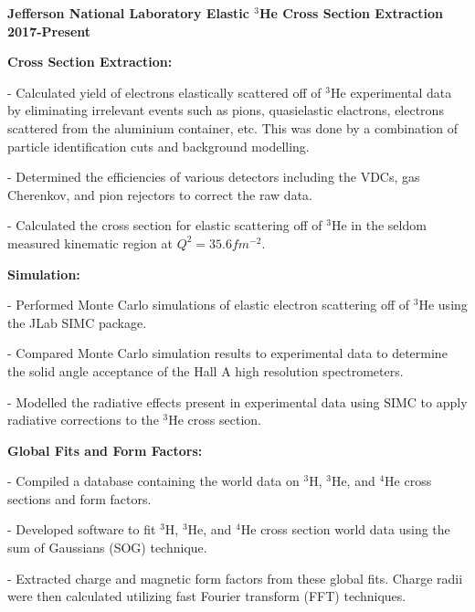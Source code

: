 \documentclass[letterpaper,10pt]{article}
\renewenvironment{itemize}{
  \begin{list}{}{
    \setlength{\leftmargin}{1.5em}
  }
}{
  \end{list}
}
\begin{document}
{\begin{itemize}
\item {\large {\bf Jefferson National Laboratory Elastic $^{3}$He Cross Section Extraction 2017-Present} }
	\begin{itemize}\itemsep1pt \parskip0pt 
		\item \textbf{Cross Section Extraction:}
			\begin{itemize}
				\item - Calculated yield of electrons elastically scattered off of $^{3}$He experimental data by eliminating irrelevant events such as pions, quasielastic elactrons, electrons scattered from the aluminium container, etc. This was done by a combination of particle identification cuts and background modelling. 
				\item - Determined the efficiencies of various detectors including the VDCs, gas Cherenkov, and pion rejectors to correct the raw data.
				\item - Calculated the cross section for elastic scattering off of $^{3}$He in the seldom measured kinematic region at $Q^2 = 35.6 fm^{-2}$.
			\end{itemize}
		\item \textbf{Simulation:}
			\begin{itemize}
				\item - Performed Monte Carlo simulations of elastic electron scattering off of $^{3}$He using the JLab SIMC package. 
				\item - Compared Monte Carlo simulation results to experimental data to determine the solid angle acceptance of the Hall A high resolution spectrometers. 
				\item - Modelled the radiative effects present in experimental data using SIMC to apply radiative corrections to the $^{3}$He cross section.
			\end{itemize}
		\item \textbf{Global Fits and Form Factors:}
			\begin{itemize}
				\item - Compiled a database containing the world data on $^{3}$H, $^{3}$He, and $^{4}$He cross sections and form factors.
				\item - Developed software to fit $^{3}$H, $^{3}$He, and $^{4}$He cross section world data using the sum of Gaussians (SOG) technique. 
				\item - Extracted charge and magnetic form factors from these global fits. Charge radii were then calculated utilizing fast Fourier transform (FFT) techniques. 
			\end{itemize}
	\end{itemize}


\end{itemize}}
\end{document}
